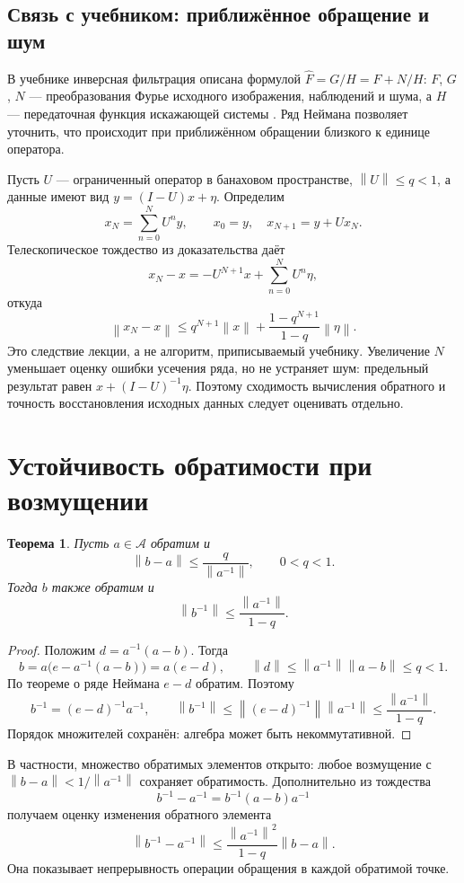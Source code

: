 \documentclass[12pt,a4paper]{article}
\newtheorem{theorem}{Теорема}
\theoremstyle{definition}
\theoremstyle{remark}
\newcommand{\norm}[1]{\left\lVert #1\right\rVert}
\begin{document}
\subsection{Связь с учебником: приближённое обращение и шум}

В учебнике инверсная фильтрация описана формулой
$\widehat F=G/H=F+N/H$: $F$, $G$, $N$ --- преобразования Фурье
исходного изображения, наблюдений и шума, а $H$ --- передаточная
функция искажающей системы \cite[\S\,5.7, с.~412]{GW2012}.
Ряд Неймана позволяет уточнить, что происходит при приближённом
обращении близкого к единице оператора.

Пусть $U$ --- ограниченный оператор в банаховом пространстве,
$\norm{U}\leqslant q<1$, а данные имеют вид
$y=(I-U)x+\eta$. Определим
\[
  x_N=\sum_{n=0}^{N}U^ny,\qquad
  x_0=y,\quad x_{N+1}=y+Ux_N.
\]
Телескопическое тождество из доказательства даёт
\[
  x_N-x=-U^{N+1}x+\sum_{n=0}^{N}U^n\eta,
\]
откуда
\[
  \boxed{\norm{x_N-x}\leqslant
    q^{N+1}\norm{x}+\frac{1-q^{N+1}}{1-q}\norm{\eta}}.
\]
Это следствие лекции, а не алгоритм, приписываемый учебнику.
Увеличение $N$ уменьшает оценку ошибки усечения ряда, но не устраняет
шум: предельный результат равен $x+(I-U)^{-1}\eta$.
Поэтому сходимость вычисления обратного и точность восстановления
исходных данных следует оценивать отдельно.

\section{Устойчивость обратимости при возмущении}

\begin{theorem}
Пусть $a\in\mathcal A$ обратим и
\[
  \norm{b-a}\leqslant\frac{q}{\norm{a^{-1}}},\qquad 0<q<1.
\]
Тогда $b$ также обратим и
\[
  \boxed{\norm{b^{-1}}\leqslant\frac{\norm{a^{-1}}}{1-q}}.
\]
\end{theorem}

\begin{proof}
Положим $d=a^{-1}(a-b)$. Тогда
\[
  b=a\bigl(e-a^{-1}(a-b)\bigr)=a(e-d),\qquad
  \norm{d}\leqslant\norm{a^{-1}}\norm{a-b}\leqslant q<1.
\]
По теореме о ряде Неймана $e-d$ обратим. Поэтому
\[
  b^{-1}=(e-d)^{-1}a^{-1},\qquad
  \norm{b^{-1}}\leqslant\norm{(e-d)^{-1}}\norm{a^{-1}}
  \leqslant\frac{\norm{a^{-1}}}{1-q}.
\]
Порядок множителей сохранён: алгебра может быть некоммутативной.
\end{proof}

В частности, множество обратимых элементов открыто: любое возмущение
с $\norm{b-a}<1/\norm{a^{-1}}$ сохраняет обратимость.
Дополнительно из тождества
\[
  b^{-1}-a^{-1}=b^{-1}(a-b)a^{-1}
\]
получаем оценку изменения обратного элемента
\[
  \norm{b^{-1}-a^{-1}}
  \leqslant\frac{\norm{a^{-1}}^2}{1-q}\norm{b-a}.
\]
Она показывает непрерывность операции обращения в каждой обратимой точке.
\end{document}
